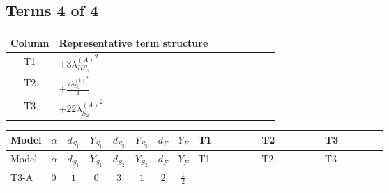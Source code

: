 \documentclass[8pt]{article}
\begin{document}
\begin{landscape}
\subsection*{Terms 4 of 4}
\begin{center}
\begin{tabular}{@{}c >{\raggedright\arraybackslash}p{0.82\linewidth}@{}}
\toprule
Column & Representative term structure \\
\midrule
T1 & \(\displaystyle +3 {\lambda_{HS_2}^{(A)}}^2\) \\
\midrule
T2 & \(\displaystyle +\frac{7 {\lambda_{S_2}^{(1)}}^2}{4}\) \\
\midrule
T3 & \(\displaystyle +22 {\lambda_{S_2}^{(A)}}^2\) \\
\midrule
\bottomrule
\end{tabular}
\end{center}
\smallskip
\tiny
\begin{longtable}{@{}llcccccc >{\raggedright\arraybackslash}p{0.21\linewidth} >{\raggedright\arraybackslash}p{0.21\linewidth} >{\raggedright\arraybackslash}p{0.21\linewidth}@{}}
\toprule
Model & $\alpha$ & $d_{S_1}$ & $Y_{S_1}$ & $d_{S_2}$ & $Y_{S_2}$ & $d_F$ & $Y_F$ & T1 & T2 & T3 \\
\midrule
\endfirsthead
\toprule
Model & $\alpha$ & $d_{S_1}$ & $Y_{S_1}$ & $d_{S_2}$ & $Y_{S_2}$ & $d_F$ & $Y_F$ & T1 & T2 & T3 \\
\midrule
\endhead
T3-A & $0$ & $1$ & $0$ & $3$ & $1$ & $2$ & $\frac{1}{2}$ & \scriptsize\adjustbox{max width=\linewidth}{$\begin{gathered} +3 {\lambda_{HS_2}^{(A)}}^2\end{gathered}$} & \scriptsize\adjustbox{max width=\linewidth}{$\begin{gathered} +\frac{7 {\lambda_{S_2}^{(1)}}^2}{4}\end{gathered}$} & \scriptsize\adjustbox{max width=\linewidth}{$\begin{gathered} +22 {\lambda_{S_2}^{(A)}}^2\end{gathered}$} \\
\midrule
\bottomrule
\end{longtable}
\end{landscape}
\end{document}
